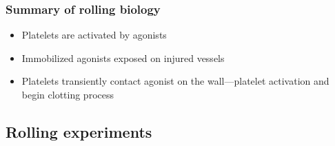 \documentclass{beamer}
\begin{document}
\begin{frame}
  \frametitle{Summary of rolling biology}
  \begin{itemize}
  \item Platelets are activated by agonists
    \vfill
  \item Immobilized agonists exposed on injured vessels
    \vfill
  \item Platelets transiently contact agonist on the wall---platelet
    activation and begin clotting process
  \end{itemize}
\end{frame}

\subsection{Rolling experiments}



%   
\end{document}
